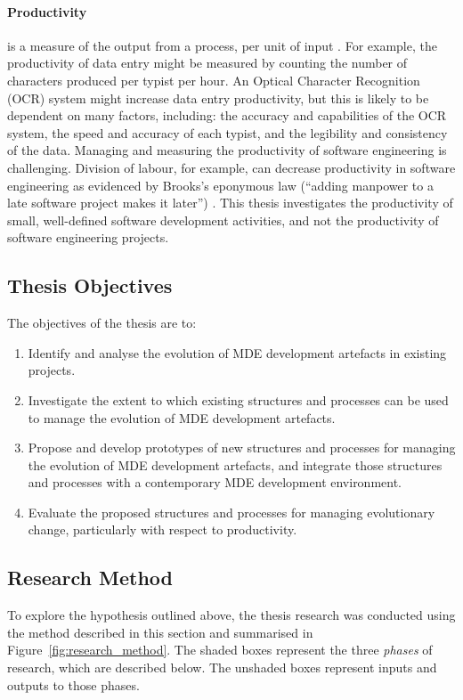 \paragraph{Productivity} is a measure of the output from a process, per unit of input \cite{beattie07economics}. For example, the productivity of data entry might be measured by counting the number of characters produced per typist per hour. An Optical Character Recognition (OCR) system might increase data entry productivity, but this is likely to be dependent on many factors, including: the accuracy and capabilities of the OCR system, the speed and accuracy of each typist, and the legibility and consistency of the data. Managing and measuring the productivity of software engineering is challenging. Division of labour, for example, can decrease productivity in software engineering as evidenced by Brooks's eponymous law (``adding manpower to a late software project makes it later'') \cite{brooks95mythical}. This thesis investigates the productivity of small, well-defined software development activities, and not the productivity of software engineering projects.

\subsection{Thesis Objectives}
The objectives of the thesis are to:

\begin{enumerate}
	\item Identify and analyse the evolution of MDE development artefacts in existing projects.
	\item Investigate the extent to which existing structures and processes can be used to manage the evolution of MDE development artefacts. 
	\item Propose and develop prototypes of new structures and processes for managing the evolution of MDE development artefacts, and integrate those structures and processes with a contemporary MDE development environment.
	\item Evaluate the proposed structures and processes for managing evolutionary change, particularly with respect to productivity.
\end{enumerate}

\subsection{Research Method}
\label{sec:research_method}
To explore the hypothesis outlined above, the thesis research was conducted using the method described in this section and summarised in Figure~\ref{fig:research_method}. The shaded boxes represent the three \emph{phases} of research, which are described below. The unshaded boxes represent inputs and outputs to those phases.


